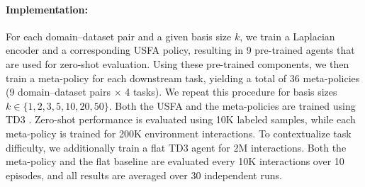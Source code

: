 \documentclass{article}
\theoremstyle{plain}
\theoremstyle{definition}
\theoremstyle{remark}
\begin{document}
\paragraph{Implementation:} For each domain--dataset pair and a given basis size $k$, we train a Laplacian encoder and a corresponding USFA policy, resulting in 9 pre-trained agents that are used for zero-shot evaluation. Using these pre-trained components, we then train a meta-policy for each downstream task, yielding a total of 36 meta-policies (9 domain--dataset pairs $\times$ 4 tasks). We repeat this procedure for basis sizes $k \in \{1, 2, 3, 5, 10, 20, 50\}$. Both the USFA and the meta-policies are trained using TD3 \citep{fujimoto2018addressing}. Zero-shot performance is evaluated using 10K labeled samples, while each meta-policy is trained for 200K environment interactions. To contextualize task difficulty, we additionally train a flat TD3 agent for 2M interactions. Both the meta-policy and the flat baseline are evaluated every 10K interactions over 10 episodes, and all results are averaged over 30 independent runs.
\end{document}
